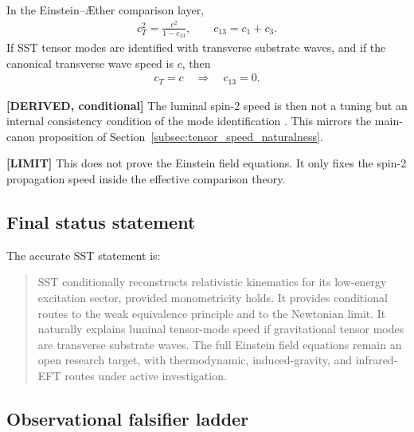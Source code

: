 In the Einstein--\AE ther comparison layer,
\begin{align}
    c_T^2
    =
    \frac{c^2}{1-c_{13}},
    \qquad
    c_{13}=c_1+c_3 .
\end{align}
If SST tensor modes are identified with transverse substrate waves, and if the
canonical transverse wave speed is \(c\), then
\begin{align}
    c_T=c
    \quad\Rightarrow\quad
    c_{13}=0 .
\end{align}

\textbf{[DERIVED, conditional]} The luminal spin-2 speed is then not a tuning
but an internal consistency condition of the mode identification
\cite{FosterJacobson2006,Abbott2017GW170817}. This mirrors the main-canon
proposition of Section~\ref{subsec:tensor_speed_naturalness}.

\textbf{[LIMIT]} This does not prove the Einstein field equations. It only
fixes the spin-2 propagation speed inside the effective comparison theory.

\subsection{Final status statement}

The accurate SST statement is:

\begin{quote}
SST conditionally reconstructs relativistic kinematics for its low-energy
excitation sector, provided monometricity holds. It provides conditional routes
to the weak equivalence principle and to the Newtonian limit. It naturally
explains luminal tensor-mode speed if gravitational tensor modes are transverse
substrate waves. The full Einstein field equations remain an open research
target, with thermodynamic, induced-gravity, and infrared-EFT routes under
active investigation.
\end{quote}

\subsection{Observational falsifier ladder}

